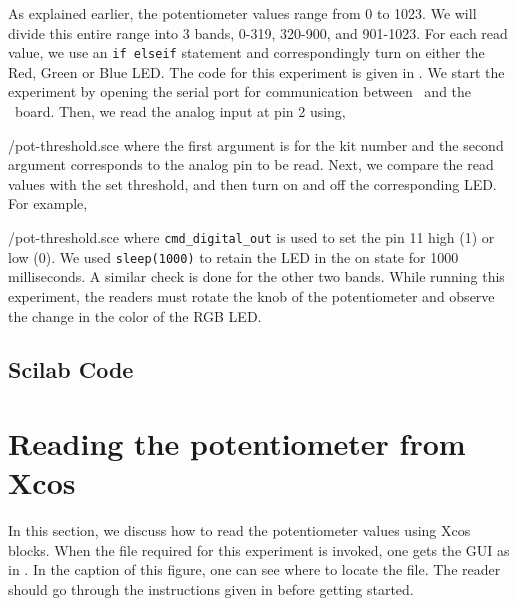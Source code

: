 As explained earlier, the potentiometer values range from 0 to 1023. We will divide this entire range into 3
bands, 0-319, 320-900, and 901-1023. For each read value, we use an
{\tt if elseif} statement and correspondingly turn on either the Red,
Green or Blue LED. The code for this experiment is given in
. We start the experiment by opening the serial
port for communication between \scilab\ and the \arduino\ board. Then,
we read the analog input at pin 2 using,

                {\LocPotscicode/pot-threshold.sce} where the first
                argument is for
the kit number and the second argument corresponds to the analog pin to be read.  Next, we compare the read values with the set threshold, 
and then turn on and off the corresponding LED. For example, 

{\LocPotscicode/pot-threshold.sce} where {\tt cmd\_digital\_out} 
is used to set the pin 11 high (1) or low (0). 
We used {\tt sleep(1000)} to retain the LED in the on state for 
1000 milliseconds.  
A similar check is done for the other two bands. 
While running this experiment, 
the readers must rotate the knob of the potentiometer and observe 
the change in the color of the RGB LED. 

\subsection{Scilab Code}
\label{sec:pot-scilab-code}
\begin{scicode}
\label{sci:pot-100}

\end{scicode}

\section{Reading the potentiometer from Xcos}
In this section, we discuss how to read the potentiometer values using
Xcos blocks. When the file required for this experiment is invoked, one
gets the GUI as in .  In the caption of this
figure, one can see where to locate the file.  The reader should go
through the instructions given in  before
getting started.

